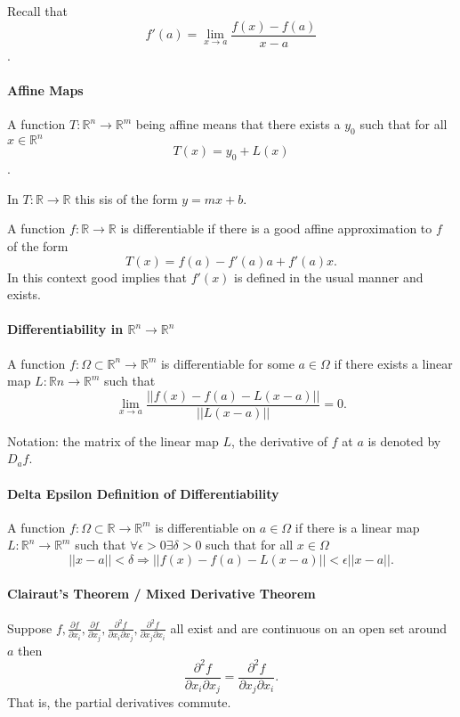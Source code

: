\documentclass[12pt, letterpaper]{article}
\begin{document}
	Recall that \[f'(a) = \lim_{x\to a} \frac{f(x) - f(a)}{x-a}\].

    \paragraph{Affine Maps}
    A function \(T: \mathbb{R}^n \to \mathbb{R}^m\) being affine means that there exists
    a \(y_0\) such that for all \(x\in \mathbb{R}^n\)
    \[T(x) = y_0 + L(x)\].

    In \(T: \mathbb{R}\to \mathbb{R}\) this sis of the form \(y = mx+b\).

    A function \(f: \mathbb{R}\to \mathbb{R}\) is differentiable if there is 
    a good affine approximation to \(f\) of the form
    \[T(x) = f(a) - f'(a)a + f'(a)x.\]
    In this context good implies that \(f'(x)\) is defined in the usual manner
    and exists.

    \paragraph{Differentiability in \(\mathbb{R}^n\to \mathbb{R}^n\)}
    
    A function \(f: \Omega\subset \mathbb{R}^n \to \mathbb{R}^m\) is differentiable for some
    \(a\in\mathbb{\Omega}\) if there exists a linear map \(L: \mathbb{R}n\to \mathbb{R}^m\)
    such that
    \[
    \lim_{x\to a} \frac{
        \left|\left|f(x) - f(a) -L(x-a)\right|\right|
    } {
        \left|\left|L(x-a)\right|\right|
    } = 0.
    \]

    Notation: the matrix of the linear map \(L\), the derivative of \(f\) at
    \(a\) is denoted by \(D_af\).

    \paragraph{Delta Epsilon Definition of Differentiability}
    A function \(f: \Omega\subset \mathbb{R}\to \mathbb{R}^m\) is 
    differentiable on \(a\in \Omega\) if there is a linear map \(L: \mathbb{R}^n\to \mathbb{R}^m\)
    such that \(\forall \epsilon > 0 \exists \delta > 0 \)
    such that for all \(x\in \Omega\)
    \[
    \left|\left|x - a\right|\right| < \delta
    \Rightarrow
    \left|\left|f(x) - f(a) - L(x-a)\right|\right|
    < \epsilon\left|\left|x - a\right|\right|. 
    \]

	\paragraph{Clairaut's Theorem / Mixed Derivative Theorem}
	Suppose \(
	f, \frac{\partial f}{\partial x_i}, \frac{\partial f}{\partial x_j},
		\frac{\partial^2 f}{\partial x_i \partial x_j},
		\frac{\partial^2 f}{\partial x_j \partial x_i}
	\)
	all exist and are continuous on an open set around \(a\) then
	\[
		\frac{\partial^2 f}{\partial x_i \partial x_j}
		=
		\frac{\partial^2 f}{\partial x_j \partial x_i}.
	\]
	That is, the partial derivatives commute.
\end{document}

